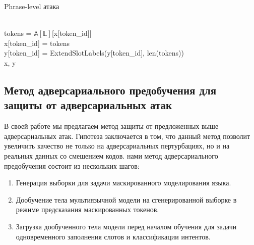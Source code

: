 \begin{algorithm}
    \caption{Phrase-level атака}
    \begin{algorithmic}
                \\
                \ind\ind tokens = $\mathbb{A}[\mathbb{L}]$[x[token\_id]]\\
                \ind\ind x[token\_id] = tokens\\
                \ind\ind y[token\_id] = ExtendSlotLabels(y[token\_id], len(tokens))
            \EndIf \\
            \ind\Return x, y
        \EndFunction
    \end{algorithmic}\label{alg:algorithm2}
\end{algorithm}



\subsection{Метод адверсариального предобучения для защиты от адверсариальных атак}
В своей работе мы предлагаем метод защиты от предложенных выше адверсариальных атак.
Гипотеза заключается в том, что данный метод позволит увеличить качество не только на адверсариальных пертурбациях, но и на реальных данных со смешением кодов.
 нами метод адверсариального предобучения состоит из нескольких шагов:
\begin{enumerate}
    \item Генерация выборки для задачи маскированного моделирования языка.
    \item Дообучение тела мультиязычной модели на сгенерированной выборке в режиме предсказания маскированных токенов.
    \item Загрузка дообученного тела модели перед началом обучения для задачи одновременного заполнения слотов и классификации интентов.
\end{enumerate}

